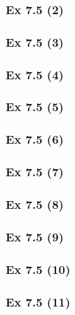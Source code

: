 \subsubsection{Ex 7.5 (2)}\label{sec:Ex_7.5.2}

\subsubsection{Ex 7.5 (3)}\label{sec:Ex_7.5.3}

\subsubsection{Ex 7.5 (4)}\label{sec:Ex_7.5.4}

\subsubsection{Ex 7.5 (5)}\label{sec:Ex_7.5.5}

\subsubsection{Ex 7.5 (6)}\label{sec:Ex_7.5.6}

\subsubsection{Ex 7.5 (7)}\label{sec:Ex_7.5.7}

\subsubsection{Ex 7.5 (8)}\label{sec:Ex_7.5.8}

\subsubsection{Ex 7.5 (9)}\label{sec:Ex_7.5.9}

\subsubsection{Ex 7.5 (10)}\label{sec:Ex_7.5.10}

\subsubsection{Ex 7.5 (11)}\label{sec:Ex_7.5.11}

